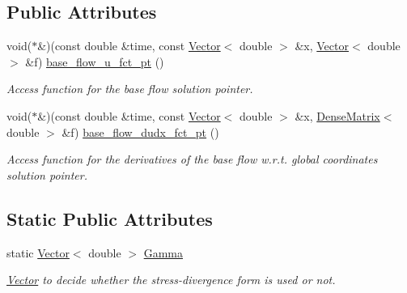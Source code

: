\subsection*{Public Attributes}
\begin{DoxyCompactItemize}
\item 
void($\ast$\&)(const double \&time, const \hyperlink{classoomph_1_1Vector}{Vector}$<$ double $>$ \&x, \hyperlink{classoomph_1_1Vector}{Vector}$<$ double $>$ \&f) \hyperlink{classoomph_1_1LinearisedNavierStokesEquations_ac473c07cd3179d33f11faf2cb6b64acf}{base\+\_\+flow\+\_\+u\+\_\+fct\+\_\+pt} ()
\begin{DoxyCompactList}\small\item\em Access function for the base flow solution pointer. \end{DoxyCompactList}\item 
void($\ast$\&)(const double \&time, const \hyperlink{classoomph_1_1Vector}{Vector}$<$ double $>$ \&x, \hyperlink{classoomph_1_1DenseMatrix}{Dense\+Matrix}$<$ double $>$ \&f) \hyperlink{classoomph_1_1LinearisedNavierStokesEquations_aa4deb21fdf8534b50eccd9d09b4a2687}{base\+\_\+flow\+\_\+dudx\+\_\+fct\+\_\+pt} ()
\begin{DoxyCompactList}\small\item\em Access function for the derivatives of the base flow w.\+r.\+t. global coordinates solution pointer. \end{DoxyCompactList}\end{DoxyCompactItemize}
\subsection*{Static Public Attributes}
\begin{DoxyCompactItemize}
\item 
static \hyperlink{classoomph_1_1Vector}{Vector}$<$ double $>$ \hyperlink{classoomph_1_1LinearisedNavierStokesEquations_a2d1baad0906ab2dc98ae773aa6463b7e}{Gamma}
\begin{DoxyCompactList}\small\item\em \hyperlink{classoomph_1_1Vector}{Vector} to decide whether the stress-\/divergence form is used or not. \end{DoxyCompactList}\end{DoxyCompactItemize}
